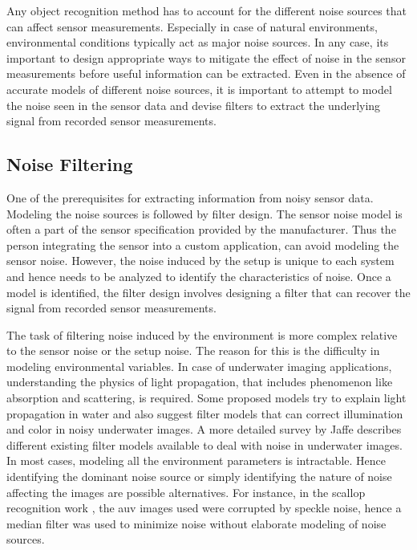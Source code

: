 \documentclass {udthesis}
\begin{document}
Any object recognition method has to account for the different noise sources that can affect sensor measurements. Especially in case of natural environments, environmental conditions typically act as major noise sources. 
In any case, its important to design appropriate ways to mitigate the effect of noise 
in the sensor measurements before useful information can be extracted. 
Even in the absence of accurate models of different noise sources, it is important to attempt to model the noise seen in the sensor data
and devise filters to extract the underlying signal from recorded sensor measurements.

\subsection{Noise Filtering}
\label{sec:noise_filters}

One of the prerequisites for extracting information from noisy sensor data. 
Modeling the noise sources is followed by filter design.
The sensor noise model is often a part of the sensor specification provided by the manufacturer. 
Thus the person integrating the sensor into a custom application, can avoid modeling the sensor noise. 
However, the noise induced by the setup is unique to each system and hence needs to be analyzed to identify the characteristics of noise.
Once a model is identified, the filter design involves designing a filter that can recover the signal from recorded sensor measurements.

The task of filtering noise induced by the environment is more complex relative to 
the sensor noise or the setup noise.
The reason for this is the difficulty in modeling environmental variables. 
In case of underwater imaging applications, understanding the physics of 
light propagation, that includes phenomenon like absorption and scattering, is required. Some proposed models \cite{garcia, ahlen} try to 
explain light propagation in water and also suggest filter models that can correct illumination and color in noisy underwater images. A more detailed survey
by Jaffe \cite{jaffe} describes different existing filter models available to deal with noise in underwater images.
In most cases, modeling all the environment parameters is intractable. Hence identifying the dominant noise source or simply identifying the nature of noise affecting the images are possible alternatives.
For instance, in the scallop recognition work \cite{prasanna_aslo}, the \gls{auv} images used were corrupted by speckle noise, hence a median filter \cite{despeckle} was used to minimize noise without elaborate modeling of noise sources.
\end{document}
